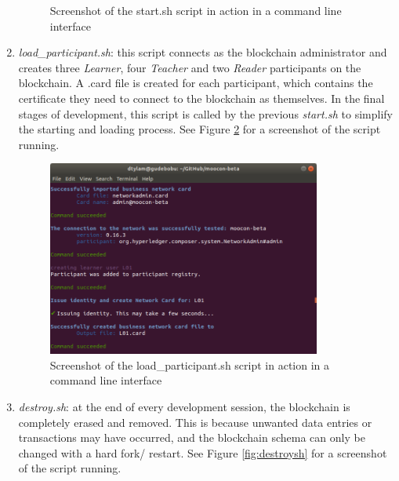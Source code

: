 \begin{enumerate}
\begin{figure}[!ht]
		      \caption[Blockchain Startup Script Screenshot]
		      {Screenshot of the start.sh script in action in a command line interface}
		      \label{fig:startsh}
	      \end{figure}
	\item \textit{load\_participant.sh}: this script connects as the blockchain administrator and creates
	      three \textit{Learner}, four \textit{Teacher} and two \textit{Reader} participants on the blockchain.
	      A .card file is created for each participant, which contains the certificate they need to
	      connect to the blockchain as themselves. In the final stages of development, this script is called by
	      the previous \textit{start.sh} to simplify the starting and loading process.
	      See Figure \ref{fig:load_participantsh} for a screenshot of the script running.
	      \begin{figure}[!ht]
		      \centering
		      \includegraphics[width=0.85\textwidth]{load_participantsh}
		      \caption[Participant Loading Script Screenshot]
		      {Screenshot of the load\_participant.sh script in action in a command line interface}
		      \label{fig:load_participantsh}
	      \end{figure}
	\item \textit{destroy.sh}: at the end of every development session, the blockchain is completely
	      erased and removed. This is because unwanted data entries or transactions may have occurred, and
	      the blockchain schema can only be changed with a hard fork/ restart.
	      See Figure \ref{fig:destroysh} for a screenshot of the script running.
	      \begin{figure}[!ht]
		      \centering

\end{figure}
\end{enumerate}
